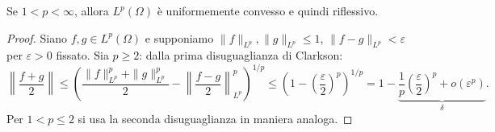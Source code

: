 \begin{theorem}
	Se $1 < p < \infty$, allora $L^p(\Omega)$ è uniformemente convesso e quindi riflessivo.
\end{theorem}
\begin{proof}
	Siano $f,g \in L^p(\Omega)$ e supponiamo $\|f\|_{L^p}, \|g\|_{L^p} \leq 1$, $\|f-g\|_{L^p} < \varepsilon$ per $\varepsilon>0$ fissato.
	Sia $p \geq 2$: dalla prima disuguaglianza di Clarkson:
	\begin{equation*}
		\left\| \frac{f+g}2 \right\|
		\leq \left(\frac{\|f\|_{L^p}^p+\|g\|_{L^p}^p}2 - \left\| \frac{f-g}2\right\|_{L^p}^p \right)^{1/p}
		\leq \left( 1 - \left(\frac{\varepsilon}{2}\right)^p \right)^{1/p} = 1 - \underbrace{\frac1p \left(\frac{\varepsilon}{2}\right)^p + o(\varepsilon^p)}_{\delta}.
	\end{equation*}
	Per $1 < p \leq 2$ si usa la seconda disuguaglianza in maniera analoga.
\end{proof}

